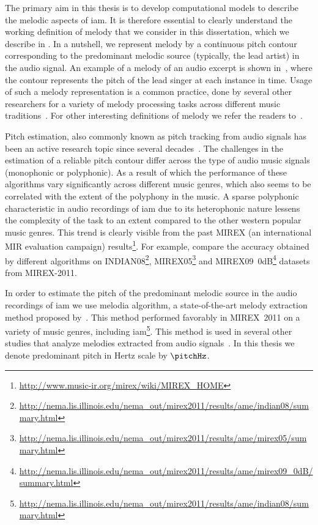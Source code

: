 {The primary aim in this thesis is to develop computational models to describe the melodic aspects of \gls{iam}. It is therefore essential to clearly understand the working definition of melody that we consider in this dissertation, which we describe in . In a nutshell, we represent melody by a continuous pitch contour corresponding to the predominant melodic source (typically, the lead artist) in the audio signal. An example of a melody of an audio excerpt is shown in~, where the contour represents the pitch of the lead singer at each instance in time. Usage of such a melody representation is a common practice, done by several other researchers for a variety of melody processing tasks across different music traditions~\citep{Dutta2014,Ishwar2013,Rao2014,koduri2014intonation,senturk2013score,pikrakis2012tracking,pikrakis2003recognition,moelants2009exploring}. For other interesting definitions of melody we refer the readers to~\citep{Salamon2012}. 


Pitch estimation, also commonly known as pitch tracking from audio signals has been an active research topic since several decades~\citep{salamon:phd:13}. The challenges in the estimation of a reliable pitch contour differ across the type of audio music signals (monophonic or polyphonic). As a result of which the performance of these algorithms vary significantly across different music genres, which also seems to be correlated with the extent of the polyphony in the music. A sparse polyphonic characteristic in audio recordings of \gls{iam} due to its heterophonic nature lessens the complexity of the task to an extent compared to the other western popular music genres. This trend is clearly visible from the past MIREX (an international MIR evaluation campaign) results\footnote{\url{http://www.music-ir.org/mirex/wiki/MIREX_HOME}}. For example, compare the accuracy obtained by different algorithms on INDIAN08\footnote{\url{http://nema.lis.illinois.edu/nema_out/mirex2011/results/ame/indian08/summary.html}}, MIREX05\footnote{\url{http://nema.lis.illinois.edu/nema_out/mirex2011/results/ame/mirex05/summary.html}} and  MIREX09~0dB\footnote{\url{http://nema.lis.illinois.edu/nema_out/mirex2011/results/ame/mirex09_0dB/summary.html}} datasets from MIREX-2011. 

In order to estimate the pitch of the predominant melodic source in the audio recordings of \gls{iam} we use \gls{melodia} algorithm, a state-of-the-art melody extraction method proposed by~\cite{Salamon2012}. This method performed favorably in MIREX~2011 on a variety of music genres, including \gls{iam}\footnote{\url{http://nema.lis.illinois.edu/nema_out/mirex2011/results/ame/indian08/summary.html}}. This method is used in several other studies that analyze melodies extracted from audio signals~\citep{Dutta2014,Ishwar2013,Rao2014,koduri2014intonation,senturk2013score,pikrakis2012tracking}. In this thesis we denote predominant pitch in Hertz scale by $\pitchHz$.

}
